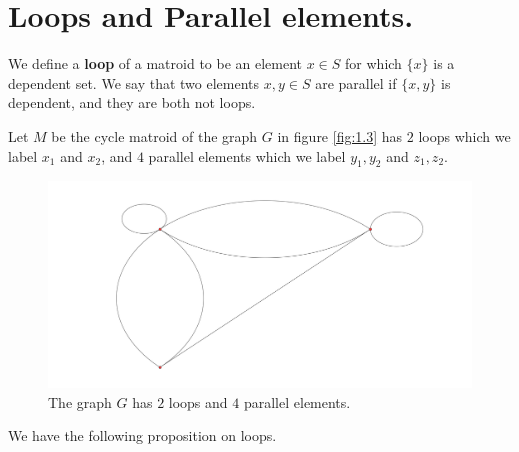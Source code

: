 
\section{Loops and Parallel elements.}

\begin{definition}
    We define a \textbf{loop} of a matroid to be an element $x \in S$ for which  $\{x\}$ is a
    dependent set. We say that two elements $x,y \in S$ are parallel if  $\{x,y\}$ is dependent, and
    they are both not loops.
\end{definition}

\begin{example}
    Let $M$ be the cycle matroid of the graph  $G$ in figure \ref{fig:1.3} has $2$ loops which we
    label $x_1$ and $ x_2$, and $4$ parallel elements which we label $y_1,y_2$ and $z_1,z_2$.

    \begin{figure} 
        \centering
        \includegraphics[scale = 0.1]{Figures/Chapter1/loopsAndParallels.png}
        \caption{The graph $G$ has $2$ loops and  $4$ parallel elements.}
    \end{figure}
\end{example} 

We have the following proposition on loops.

